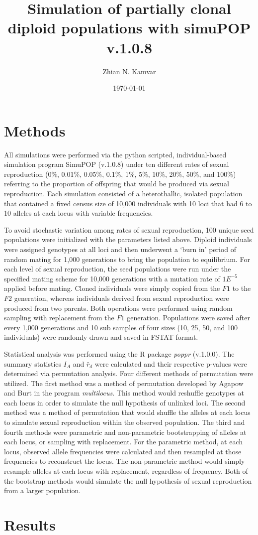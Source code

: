 \documentclass[letterpaper, draft, 10pt]{article}
\title{Simulation of partially clonal diploid populations with simuPOP v.1.0.8}
\author{Zhian N. Kamvar}
\date{\today}
\newcommand{\tab}{\hspace*{1.5em}}
\begin{document}
\maketitle
\linenumbers

\section{Methods}
\tab All simulations were performed via the python scripted, individual-based simulation program SimuPOP (v.1.0.8) under ten different rates of sexual reproduction (0\%, 0.01\%, 0.05\%, 0.1\%, 1\%, 5\%, 10\%, 20\%, 50\%, and 100\%) referring to the proportion of offspring that would be produced via sexual reproduction. 
Each simulation consisted of a heterothallic, isolated population that contained a fixed census size of 10,000 individuals with 10 loci that had 6 to 10 alleles at each locus with variable frequencies. 

To avoid stochastic variation among rates of sexual reproduction, 100 unique seed populations were initialized with the parameters listed above.
Diploid individuals were assigned genotypes at all loci and then underwent a `burn in' period of random mating for 1,000 generations to bring the population to equilibrium. 
For each level of sexual reproduction, the seed populations were run under the specified mating scheme for 10,000 generations with a mutation rate of $1E^{-5}$ applied before mating. 
Cloned individuals were simply copied from the $F1$ to the $F2$ generation, whereas individuals derived from sexual reproduction were produced from two parents. Both operations were performed using random sampling with replacement from the $F1$ generation.
Populations were saved after every 1,000 generations and 10 sub samples of four sizes (10, 25, 50, and 100 individuals) were randomly drawn and saved in FSTAT format. 

Statistical analysis was performed using the R package \textit{poppr} (v.1.0.0). 
The summary statistics $I_A$ and $\bar{r}_d$ were calculated and their respective p-values were determined via permutation analysis.
Four different methods of permutation were utilized.
The first method was a method of permutation developed by Agapow and Burt in the program \textit{multilocus}.
This method would reshuffle genotypes at each locus in order to simulate the null hypothesis of unlinked loci. 
The second method was a method of permutation that would shuffle the alleles at each locus to simulate sexual reproduction within the observed population.
The third and fourth methods were parametric and non-parametric bootstrapping of alleles at each locus, or sampling with replacement. 
For the parametric method, at each locus, observed allele frequencies were calculated and then resampled at those frequencies to reconstruct the locus. 
The non-parametric method would simply resample alleles at each locus with replacement, regardless of frequency.
Both of the bootstrap methods would simulate the null hypothesis of sexual reproduction from a larger population. 

\section{Results}
\tab 
\end{document}
